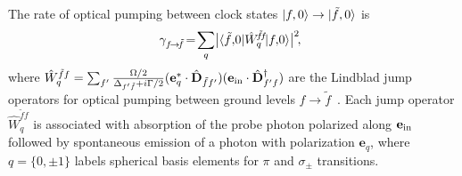 \documentclass[aps,pra,twocolumn]{revtex4-1} %
\begin{document}
\begin{appendix}
The rate of optical pumping between clock states $\lvert{f,0}\rangle \rightarrow \lvert{\tilde{f},0}\rangle$ is
	\begin{equation}\label{Eq::gammaff}
		\!\!\gamma_{f \!\rightarrow\! \tilde{f} }\! 
		=\!\sum_{q}\!\big| \bra{\tilde{f},\!0} \hat{W}_q^{\!\tilde{f}\!f} \!\ket{f,\!0} \big|^2\!,
	\end{equation}
where $ \hat{W}_q^{\tilde{f}f} = \sum_{f'}\frac{\Omega/2}{\Delta_{f'\tilde{f}}+i\Gamma/2}(\mathbf{e}_q^*\cdot\hat{\mathbf{D}}_{\tilde{f} f'} )(\mathbf{e}_{\rm in}\cdot \hat{\mathbf{D}}^\dagger_{f'f} ) $ are the Lindblad jump operators for optical pumping between ground levels $ f\rightarrow \tilde{f} $~\cite{deutsch_quantum_2010}. 
Each jump operator $\hat{W}_q^{\tilde{f}f}$ is associated with absorption of the probe photon polarized along $ \mathbf{e}_{\rm in} $ followed by spontaneous emission of a photon with polarization $ \mathbf{e}_q $, where $q= \{0,\pm 1\}$ labels spherical basis elements for $\pi$ and $ \sigma_\pm$ transitions.  


\end{appendix}
\end{document}
